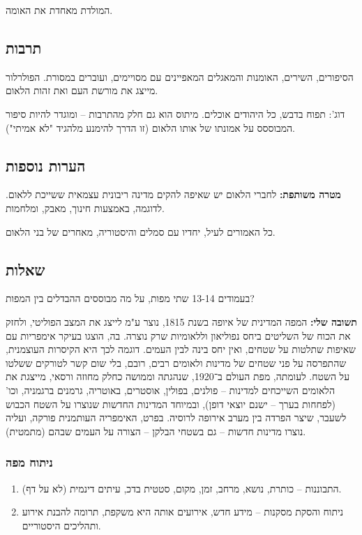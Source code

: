 \documentclass[a4paper]{book}
\begin{document}
	המולדת מאחדת את האומה. 
	
	\subsection{תרבות}
	הסיפורים, השירים, האומנות והמאגלים המאפיינים עם מסויימים, ועוברים במסורת. הפולרלור מייצג את מורשת העם ואת זהות הלאום. 
	
	דוג': תפוח בדבש, כל היהודים אוכלים. מיתוס הוא גם חלק מהתרבות – ומוגדר להיות סיפור המבוססס על אמונתו של אותו הלאום (זו הדרך להימנע מלהגיד "לא אמיתי"). 
	
	\subsection{הערות נוספות}
	
	\textbf{מטרה משותפת: }לחברי הלאום יש שאיפה להקים מדינה ריבונית עצמאית ששייכת ללאום. לדוגמה, באמצעות חינוך, מאבק, ומלחמות. 
	
	כל האמורים לעיל, יחדיו עם סמלים והיסטוריה, מאחרים של בני הלאום. 
	
	\subsection{שאלות}
	בעמודים 13-14 שתי מפות, על מה מבוססים ההבדלים בין המפות? 
	
	\textbf{תשובה שלי: }המפה המדינית של איופה בשנת 1815, נוצר ע"מ לייצג את המצב הפוליטי, ולחזק את הכוח של השליטים ביחס נפוליאון וללאומיות שרק נוצרה. בה, הוצגו בעיקר אימפריות עם שאיפות שתלטות על שטחים, ואין יחס בינה לבין העמים. דוגמה לכך היא הקיסרות העוצמנית, שהתפרסה על פני שטחים של מדינות ולאומים רבים, רובם, בלי שום קשר לטורקים ששלטו על השטח. לעומתה, מפת העולם ב־1920, שנהגתה וממושה כחלק מחוזה ורסאי, מייצגת את הלאומים השייכחים למדינות – פולנים, בפולין, אוסטרים, באוטריה, גרמנים ברגמניה, וכו' (לפחחות בערך – ישנם יוצאי דופן), ובמיוחד המדינות החדשות שנוצרו על השטח הכבוש לשעבר, שיצר הפרדה בין מערב אירופה לרוסיה. בפרט, האימפריה העותמנית פורקה, ועליה נוצרו מדינות חדשות – גם בשטחי הבלקן – הצורה על העמים שבהם (מתמטית). 
	
	\subsubsection{ניתוח מפה}
	
	\begin{enumerate}
		\item התבוננות – כותרת, נושא, מרחב, זמן, מקום, סטטית בדכ, עיתים דינמית (לא על דף). 
		\item ניתוח והסקת מסקנות – מידע חדש, אירועים אותה היא משקפת, תרומה להבנת אירוע ותהליכים היסטוריים. 
	\end{enumerate}
	
\end{document}
